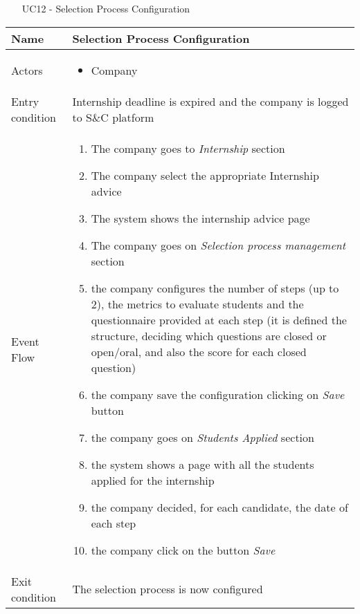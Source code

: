 				
				\begin{table} [H]
					\centering
					\begin{itemize}
						\item [UC12] - Selection Process Configuration
					\end{itemize}
					\begin{tabular}{|| P{7.5cm} | P{7.5cm} ||}
						\hline
						Name & Selection Process Configuration \\
						\hline
						Actors & \parbox{5cm}{\begin{itemize}
								\item Company
							\end{itemize}
						} \\
						\hline
						Entry condition & Internship deadline is expired and the 
						company is logged to S\&C platform  \\
						\hline
						Event Flow & \parbox{5cm}{\begin{enumerate}
								\item The company goes to \textit{Internship} section
								\item The company select the 
								appropriate Internship advice  
								\item The system shows the internship 
								advice page
								\item  The company goes on 
								\textit{Selection process management} section
								\item  the company configures the 
								number of steps (up to 2), the 
								metrics to evaluate students and 
								the questionnaire provided at 
								each step (it is defined the structure, deciding which questions are closed or open/oral, and also the score for each closed question)
								\item the company save the 
								configuration clicking on \textit{Save}
								button 
								\item the company goes on \textit{Students 
								Applied} section
								\item the system shows a page with all 
								the students applied for the 
								internship 
								\item the company decided, for each 
								candidate, the date of each step
								\item the company click on the button 
								\textit{Save}
						\end{enumerate}} \\
						\hline 
						Exit condition & The selection process is now configured 

\end{tabular}
\end{table}
